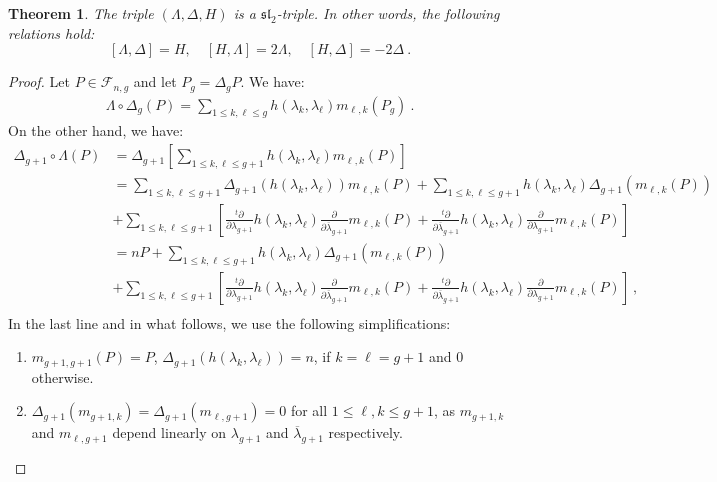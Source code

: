 \documentclass[10pt,a4paper]{amsart}
\newtheorem{theorem}{Theorem}
\newcommand\cF{{\mathcal F}}
\begin{document}
\begin{theorem}\label{proposition-sl2}
    The triple $(\Lambda,\Delta,H)$ is a $\mathfrak{sl}_2$-triple. In other words, the following relations hold:
    \[[\Lambda,\Delta]=H,\quad  [H,\Lambda]= 2\Lambda,\quad [H,\Delta]=-2\Delta~.\]
\end{theorem}

\begin{proof}
Let $P\in \cF_{n,g}$ and let $P_g=\Delta_g P$. We have: 
\begin{align}\label{eq:second-side}
\Lambda\circ\Delta_g (P)=\sum_{1\leq k,\ell\leq g}h(\lambda_k,\lambda_\ell)m_{\ell,k}(P_g)~.
\end{align}
On the other hand, we have:
 \begin{align*}
       \Delta_{g+1}\circ\Lambda( P)&= \Delta_{g+1}\left[\sum_{1\leq k,\ell\leq g+1}h(\lambda_k,\lambda_\ell)m_{\ell,k}(P)\right]\\
       &= \sum_{1\leq k,\ell\leq g+1}\Delta_{g+1}(h(\lambda_k,\lambda_\ell))m_{\ell,k}(P)+\sum_{1\leq k,\ell\leq g+1}h(\lambda_k,\lambda_\ell)\Delta_{g+1}(m_{\ell,k}(P))\\&+\sum_{1\leq k,\ell\leq g+1}\left[{\frac{^t\partial}{\partial \lambda_{g+1}}}h(\lambda_k,\lambda_\ell)\frac{\partial}{\partial \overline{\lambda}_{g+1}}m_{\ell,k}(P)+{\frac{^t\partial}{\partial \overline{\lambda}_{g+1}}}h(\lambda_k,\lambda_\ell)\frac{\partial}{\partial \lambda_{g+1}}m_{\ell,k}(P)\right]\\
       &= nP+\sum_{1\leq k,\ell\leq g+1}h(\lambda_k,\lambda_\ell)\Delta_{g+1}(m_{\ell,k}(P))\\&+\sum_{1\leq k,\ell\leq g+1}\left[{\frac{^t\partial}{\partial \lambda_{g+1}}}h(\lambda_k,\lambda_\ell)\frac{\partial}{\partial \overline{\lambda}_{g+1}}m_{\ell,k}(P)+{\frac{^t\partial}{\partial \overline{\lambda}_{g+1}}}h(\lambda_k,\lambda_\ell)\frac{\partial}{\partial \lambda_{g+1}}m_{\ell,k}(P)\right]~,\\
       \end{align*}
 In the last line and in what follows, we use the following simplifications: 
 \begin{enumerate}
     \item $m_{g+1,g+1}(P)=P$, $\Delta_{g+1}(h(\lambda_k,\lambda_\ell))=n$, if  $k=\ell=g+1$ and $0$ otherwise. 
     \item $\Delta_{g+1}(m_{g+1,k})=\Delta_{g+1}(m_{\ell,g+1})=0$ for all $1\leq \ell,k\leq g+1$, as $m_{g+1,k}$ and $m_{\ell,g+1}$ depend linearly on $\lambda_{g+1}$ and $\overline \lambda_{g+1}$ respectively.  

\end{enumerate}
\end{proof}
\end{document}
